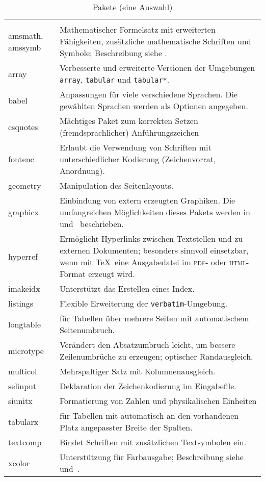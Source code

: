 \begin{longtable}[c]{@{}>{\raggedright\arraybackslash\ttfamily}p{2.2cm}%
                         p{}@{}}
 \caption{Pakete (eine Auswahl)}\label{pack} \\\toprule
\endfirsthead
 \caption[]{Pakete (eine Auswahl)}\\\toprule
\endhead
 \multicolumn{2}{r}{\small Fortsetzung nächste Seite}\\
\endfoot
\endlastfoot
 amsmath, amssymb &
 Mathematischer Formelsatz mit erweiterten Fähigkeiten, zusätzliche
 mathematische Schriften und Symbole; Beschreibung siehe \cite{mathmode}.
\\
 array &
 Verbesserte und erweiterte Versionen der Umgebungen  \texttt{array},
 \texttt{tabular} und \texttt{tabular*}.
\\
 babel &
 Anpassungen für viele verschiedene Sprachen. Die  gewählten Sprachen werden
 als Optionen angegeben.
\\
csquotes  & Mächtiges Paket zum korrekten Setzen (fremdsprachlicher) Anführungszeichen \\
 fontenc &
 Erlaubt die Verwendung von Schriften mit  unterschiedlicher Kodierung
 (Zeichenvorrat, Anordnung).
\\
 geometry &
 Manipulation des Seitenlayouts.\\
 graphicx &
 Einbindung von extern erzeugten Graphiken. Die umfangreichen Möglichkeiten
 dieses Pakets werden in~\cite{grfguide} und~\cite{grfcomp} beschrieben.
\\
 hyperref &
 Ermöglicht Hyperlinks zwischen Textstellen und zu externen Dokumenten;
 besonders sinnvoll einsetzbar, wenn mit \TeX\ eine Ausgabedatei im
 \textsc{pdf}- oder \textsc{html}-Format erzeugt wird.
\\
 imakeidx &
 Unterstützt das Erstellen eines Index.
\\
 listings & Flexible Erweiterung der \texttt{verbatim}-Umgebung.
\\
 longtable &
 für Tabellen über mehrere Seiten mit automatischem Seitenumbruch.
\\
microtype & Verändert den Absatzumbruch leicht, um bessere Zeilenumbrüche zu erzeugen; optischer Randausgleich. \\
 multicol &
 Mehrspaltiger Satz mit Kolumnenausgleich.
\\
 selinput &
 Deklaration der Zeichenkodierung im Eingabefile.
\\
siunitx   & Formatierung von Zahlen und physikalischen Einheiten  \\
 tabularx &
 für Tabellen mit automatisch an den vorhandenen Platz angepasster Breite der
 Spalten.
\\
 textcomp &
 Bindet Schriften mit zusätzlichen Textsymbolen ein.
 \\
 xcolor &
 Unterstützung für Farbausgabe;  Beschreibung  siehe~\cite{grfguide}
 und~\cite{grfcomp}.
\\
\bottomrule
\end{longtable}


